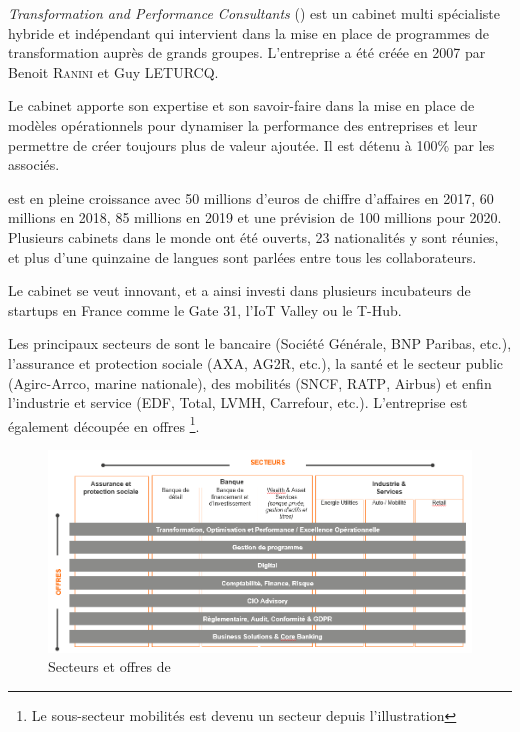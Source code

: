 \emph{Transformation and Performance Consultants} (\entreprise) est un cabinet \og multi spécialiste \fg hybride et indépendant qui intervient dans la mise en place de programmes de transformation auprès de grands groupes.
L'entreprise a été créée en 2007 par Benoit \textsc{Ranini} et Guy \textsc{LETURCQ}.

Le cabinet apporte son expertise et son savoir-faire dans la mise en place de modèles opérationnels pour dynamiser la performance des entreprises et leur permettre de créer toujours plus de valeur ajoutée. Il est détenu à 100\% par les associés.

\entreprise est en pleine croissance avec 50 millions d’euros de chiffre d’affaires en 2017, 60 millions en 2018, 85 millions en 2019 et une prévision de 100 millions pour 2020.
Plusieurs cabinets dans le monde ont été ouverts, 23 nationalités y sont réunies, et plus d'une quinzaine de langues sont parlées entre tous les collaborateurs. 

Le cabinet se veut innovant, et a ainsi investi dans plusieurs incubateurs de startups en France comme le Gate 31, l'IoT Valley ou le T-Hub.

Les principaux secteurs de \entreprise sont le bancaire (Société Générale, \textsc{BNP} Paribas, etc.), l'assurance et protection sociale (\textsc{AXA}, \textsc{AG2R}, etc.), la santé et le secteur public (Agirc-Arrco, marine nationale), des mobilités (\textsc{SNCF}, \textsc{RATP}, Airbus) et enfin l'industrie et service (\textsc{EDF}, Total, \textsc{LVMH}, Carrefour, etc.).
L'entreprise est également découpée en offres
\footnote{Le sous-secteur mobilités est devenu un secteur depuis l'illustration}.

\begin{figure}[H]
    \centering
    \includegraphics[width=1\linewidth]{img/tnp_secteurs_offres.png}
    \caption{Secteurs et offres de \entreprise{}  }
\end{figure}

